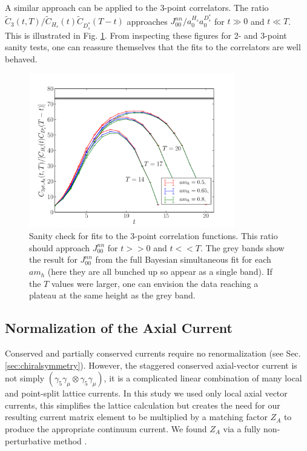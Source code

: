 A similar approach can be applied to the 3-point correlators. The ratio $\tilde{C}_3(t,T)/\tilde{C}_{H_s}(t) \tilde{C}_{D_s^*}(T-t)$ approaches $J_{00}^{nn}/a_0^{H_s}a_0^{D^*_s}$ for $t\gg 0$ and $t\ll T$. This is illustrated in Fig. \ref{eq:3pt-summary_BsDsstar}. From inspecting these figures for 2- and 3-point sanity tests, one can reassure themselves that the fits to the correlators are well behaved.

\begin{figure}[htb!]
  \begin{center}
    \vspace{-10pt}
    \includegraphics[width=0.8\textwidth]{images/BsDsstar/3ptsummary_fine.pdf}
  \caption{Sanity check for fits to the 3-point correlation functions. This ratio should approach $J_{00}^{nn}$ for $t>>0$ and $t<<T$. The grey bands show the result for $J_{00}^{nn}$ from the full Bayesian simultaneous fit for each $am_h$ (here they are all bunched up so appear as a single band). If the $T$ values were larger, one can envision the data reaching a plateau at the same height as the grey band. \label{eq:3pt-summary_BsDsstar}}
  \end{center}
  \vspace{-10pt}
\end{figure}

\subsection{Normalization of the Axial Current}

Conserved and partially conserved currents require no renormalization (see Sec. \ref{sec:chiralsymmetry}). However, the staggered conserved axial-vector current is not simply $(\gamma_5\gamma_{\mu}\otimes \gamma_5\gamma_{\mu})$, it is a complicated linear combination of many local and point-split lattice currents. In this study we used only local axial vector currents, this simplifies the lattice calculation but creates the need for our resulting current matrix element to be multiplied by a matching factor $Z_A$ to produce the appropriate continuum current. We found $Z_A$ via a fully non-perturbative method \cite{McNeile:2011ng,Donald:2013pea}.

